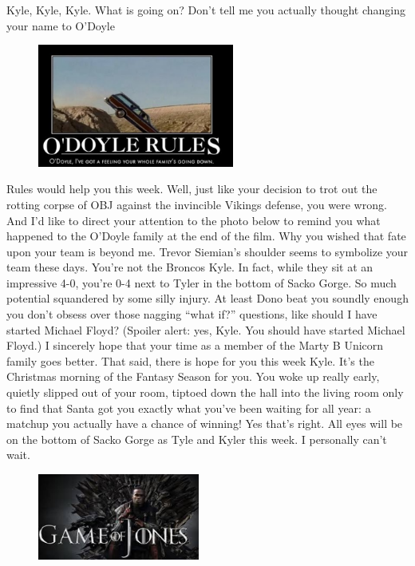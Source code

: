 \documentclass[11pt,letterpaper]{article}
\begin{document}
\newpage
{}
\par\noindent Kyle, Kyle, Kyle. What is going on? Don't tell me you actually thought changing your name to O'Doyle
\begin{figure}
\centering
\includegraphics[width=0.575\textwidth]{week4-odoyle.png}
\label{fig:week4-odoyle}
\end{figure} 
\par\noindent Rules would help you this week. Well, just like your decision to trot out the rotting corpse of OBJ against the invincible Vikings defense, you were wrong. And I'd like to direct your attention to the photo below to remind you what happened to the O'Doyle family at the end of the film. Why you wished that fate upon your team is beyond me. Trevor Siemian's shoulder seems to symbolize your team these days. You're not the Broncos Kyle. In fact, while they sit at an impressive 4-0, you're 0-4 next to Tyler in the bottom of Sacko Gorge. So much potential squandered by some silly injury. At least Dono beat you soundly enough you don't obsess over those nagging “what if?” questions, like should I have started Michael Floyd? (Spoiler alert: yes, Kyle. You should have started Michael Floyd.) I sincerely hope that your time as a member of the Marty B Unicorn family goes better. That said, there is hope for you this week Kyle. It's the Christmas morning of the Fantasy Season for you. You woke up really early, quietly slipped out of your room, tiptoed down the hall into the living room only to find that Santa got you exactly what you've been waiting for all year: a matchup you actually have a chance of winning! Yes that's right. All eyes will be on the bottom of Sacko Gorge as Tyle and Kyler this week. I personally can't wait. 
\begin{figure}
\centering
\includegraphics[width=0.475\textwidth]{week4-jones.png}
\label{fig:week3-jones}
\end{figure} 
\end{document}
